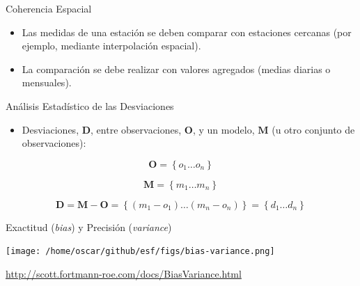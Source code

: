\documentclass[xcolor={usenames,svgnames,dvipsnames}]{beamer}
\begin{document}
\begin{frame}[label={sec:orgd5f4b25}]{Coherencia Espacial}
\begin{itemize}
\item Las medidas de una estación se deben comparar con \alert{estaciones cercanas} (por ejemplo, mediante interpolación espacial).
\item La comparación se debe realizar con \alert{valores agregados} (medias diarias o mensuales).
\end{itemize}
\end{frame}

\begin{frame}[label={sec:orge01ad7b}]{Análisis Estadístico de las Desviaciones}
\begin{itemize}
\item Desviaciones, \(\mathbf{D}\), entre observaciones, \(\mathbf{O}\), y un modelo, \(\mathbf{M}\) (u otro conjunto de observaciones):
\end{itemize}

\[
\mathbf{O} = \left\{ o_1 \dots o_n \right\}
\]

\[
\mathbf{M} = \left\{ m_1 \dots m_n  \right\}
\]

\[
\mathbf{D} = \mathbf{M} - \mathbf{O} =  \left\{ (m_1 - o_1) \dots (m_n - o_n)  \right\} = \left\{ d_1 \dots d_n  \right\}
\]
\end{frame}

\begin{frame}[label={sec:org3b9ac5c}]{Exactitud (\emph{bias}) y Precisión (\emph{variance})}
\begin{center}
\texttt{[image: /home/oscar/github/esf/figs/bias-variance.png]}
\end{center}

\url{http://scott.fortmann-roe.com/docs/BiasVariance.html}
\end{frame}
\end{document}
